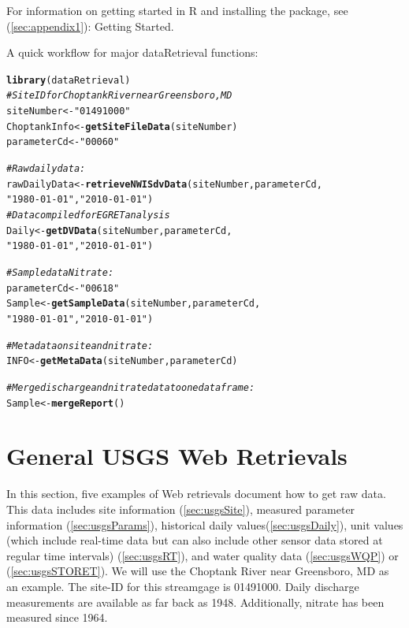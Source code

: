 \documentclass[a4paper,11pt]{article}\usepackage[]{graphicx}\usepackage[]{color}
\makeatletter
\newcommand{\hlstr}[1]{\textcolor[rgb]{0.192,0.494,0.8}{#1}}%
\newcommand{\hlcom}[1]{\textcolor[rgb]{0.678,0.584,0.686}{\textit{#1}}}%
\newcommand{\hlstd}[1]{\textcolor[rgb]{0.345,0.345,0.345}{#1}}%
\newcommand{\hlkwb}[1]{\textcolor[rgb]{0.69,0.353,0.396}{#1}}%
\newcommand{\hlkwd}[1]{\textcolor[rgb]{0.737,0.353,0.396}{\textbf{#1}}}%
\newenvironment{kframe}{%
 \def\at@end@of@kframe{}%
 \ifinner\ifhmode%
  \def\at@end@of@kframe{\end{minipage}}%
  \begin{minipage}{\columnwidth}%
 \fi\fi%
 \def\FrameCommand##1{\hskip\@totalleftmargin \hskip-\fboxsep
 \colorbox{shadecolor}{##1}\hskip-\fboxsep
     \hskip-\linewidth \hskip-\@totalleftmargin \hskip\columnwidth}%
 \MakeFramed {\advance\hsize-\width
   \@totalleftmargin\z@ \linewidth\hsize
   \@setminipage}}%
 {\par\unskip\endMakeFramed%
 \at@end@of@kframe}
\newenvironment{knitrout}{}{} %
\makeatother
\begin{document}
For information on getting started in R and installing the package, see (\ref{sec:appendix1}): Getting Started.

A quick workflow for major dataRetrieval functions:

\begin{knitrout}
\color{fgcolor}\begin{kframe}
\begin{alltt}
\hlkwd{library}\hlstd{(dataRetrieval)}
\hlcom{# Site ID for Choptank River near Greensboro, MD}
\hlstd{siteNumber} \hlkwb{<-} \hlstr{"01491000"}
\hlstd{ChoptankInfo} \hlkwb{<-} \hlkwd{getSiteFileData}\hlstd{(siteNumber)}
\hlstd{parameterCd} \hlkwb{<-} \hlstr{"00060"}

\hlcom{#Raw daily data:}
\hlstd{rawDailyData} \hlkwb{<-} \hlkwd{retrieveNWISdvData}\hlstd{(siteNumber,parameterCd,}
                      \hlstr{"1980-01-01"}\hlstd{,}\hlstr{"2010-01-01"}\hlstd{)}
\hlcom{# Data compiled for EGRET analysis}
\hlstd{Daily} \hlkwb{<-} \hlkwd{getDVData}\hlstd{(siteNumber,parameterCd,}
                      \hlstr{"1980-01-01"}\hlstd{,}\hlstr{"2010-01-01"}\hlstd{)}

\hlcom{# Sample data Nitrate:}
\hlstd{parameterCd} \hlkwb{<-} \hlstr{"00618"}
\hlstd{Sample} \hlkwb{<-} \hlkwd{getSampleData}\hlstd{(siteNumber,parameterCd,}
                      \hlstr{"1980-01-01"}\hlstd{,}\hlstr{"2010-01-01"}\hlstd{)}

\hlcom{# Metadata on site and nitrate:}
\hlstd{INFO} \hlkwb{<-} \hlkwd{getMetaData}\hlstd{(siteNumber,parameterCd)}

\hlcom{# Merge discharge and nitrate data to one dataframe:}
\hlstd{Sample} \hlkwb{<-} \hlkwd{mergeReport}\hlstd{()}
\end{alltt}
\end{kframe}
\end{knitrout}


\section{General USGS Web Retrievals}
\label{sec:genRetrievals}
In this section, five examples of Web retrievals document how to get raw data. This data includes site information (\ref{sec:usgsSite}), measured parameter information (\ref{sec:usgsParams}), historical daily values(\ref{sec:usgsDaily}), unit values (which include real-time data but can also include other sensor data stored at regular time intervals) (\ref{sec:usgsRT}), and water quality data (\ref{sec:usgsWQP}) or (\ref{sec:usgsSTORET}). We will use the Choptank River near Greensboro, MD as an example.  The site-ID for this streamgage is 01491000. Daily discharge measurements are available as far back as 1948.  Additionally, nitrate has been measured since 1964. 
\end{document}
